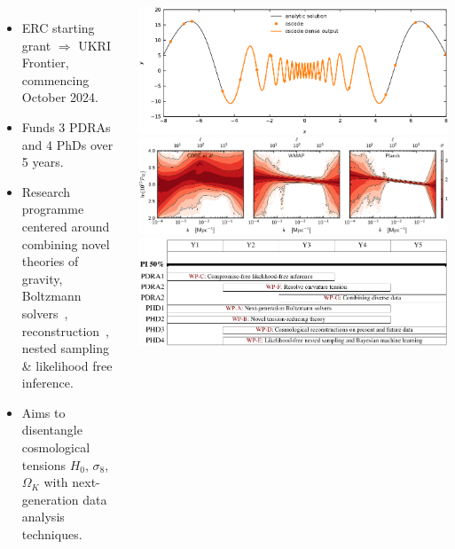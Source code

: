 \documentclass[aspectratio=169, handout]{beamer}
\begin{document}
\begin{frame}
    \begin{columns}
        \begin{itemize}
            \item ERC starting grant $\Rightarrow$ UKRI Frontier, commencing October 2024.
            \item Funds 3 PDRAs and 4 PhDs over 5 years.
            \item Research programme centered around combining novel theories of gravity, Boltzmann solvers~, reconstruction~, nested sampling \& likelihood free inference.
            \item Aims to disentangle cosmological tensions $H_0$, $\sigma_8$, $\Omega_K$ with next-generation data analysis techniques.
        \end{itemize}
        \includegraphics[width=\textwidth]{figures/denseoutput.pdf}
        \includegraphics[width=\textwidth]{figures/pps.pdf}
        \includegraphics[width=\textwidth]{figures/gantt.pdf}
    \end{columns}

\end{frame}
\end{document}
